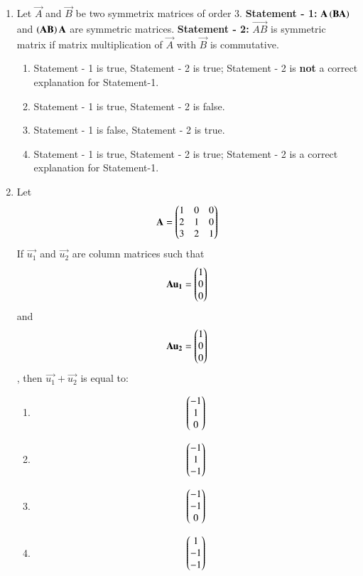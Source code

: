 \documentclass[journal,onecolumn]{IEEEtran}
\theoremstyle{remark}
\begin{document}
\begin{enumerate}
\item Let $\vec{A}$ and $\vec{B}$ be two symmetrix matrices of order $3$.
	\newline
	\textbf{Statement - 1:} $\mathbf{A}\left(\mathbf{BA}\right)$ and $\left(\mathbf{AB}\right)\mathbf{A}$ are symmetric matrices. 
	\newline
	\textbf{Statement - 2:} $\vec{AB}$ is symmetric matrix if matrix multiplication of $\vec{A}$ with $\vec{B}$ is commutative.

	\begin{enumerate}
		\item Statement - 1 is true, Statement - 2 is true; Statement - 2 is \textbf{not} a correct explanation for Statement-1. 
	    	\item Statement - 1 is true, Statement - 2 is false. 
	    	\item Statement - 1 is false, Statement - 2 is true.
	    	\item Statement - 1 is true, Statement - 2 is true; Statement - 2 is a correct explanation for Statement-1. 
	\end{enumerate}

	\item Let \begin{align*}
	\mathbf{A} = \begin{pmatrix} 
		1&0&0\\
		2&1&0\\
		3&2&1
	\end{pmatrix}
	\end{align*} If $\vec{u_1}$ and $\vec{u_2}$ are column matrices such that
	\begin{align*}
		\mathbf{Au_1} = \begin{pmatrix}1\\0\\0\end{pmatrix}
	\end{align*} and 
	\begin{align*}
		\mathbf{Au_2} = \begin{pmatrix}1\\0\\0\end{pmatrix}
	\end{align*}, then $\vec{u_1} + \vec{u_2}$ is equal to:
	\hfill{}
        \begin{enumerate}
	    	\item \begin{align*} \begin{pmatrix}-1\\1\\0\end{pmatrix} \end{align*} 
		\item \begin{align*} \begin{pmatrix}-1\\1\\-1\end{pmatrix} \end{align*} 
		\item \begin{align*} \begin{pmatrix}-1\\-1\\0\end{pmatrix} \end{align*}
		\item \begin{align*} \begin{pmatrix}1\\-1\\-1\end{pmatrix} \end{align*} 
        \end{enumerate}


\end{enumerate}
\end{document}
